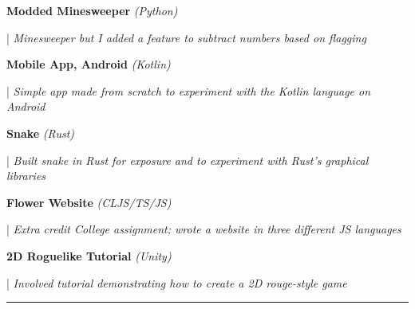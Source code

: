 \documentclass[letterpaper,11pt]{article}
\begin{document}
\begin{minipage}[t]{0.28\textwidth}
	\raggedright
	\textbf{ Modded Minesweeper }\textit{(Python)} \\
\end{minipage}
\hfill
\begin{minipage}[t]{0.70\textwidth}
	\raggedright
	|\textit{ Minesweeper but I added a feature to subtract numbers based on flagging} \\
\end{minipage}

\begin{minipage}[t]{0.28\textwidth}
	\raggedright
	\textbf{ Mobile App, Android }\textit{(Kotlin)} \\
\end{minipage}
\hfill
\begin{minipage}[t]{0.70\textwidth}
	\raggedright
	|\textit{ Simple app made from scratch to experiment with the Kotlin language on Android} \\
\end{minipage}

\begin{minipage}[t]{0.28\textwidth}
	\raggedright
	\textbf{ Snake }\textit{(Rust)}\\
\end{minipage}
\hfill
\begin{minipage}[t]{0.70\textwidth}
	\raggedright
	|\textit{ Built snake in Rust for exposure and to experiment with Rust's graphical libraries} \\
\end{minipage}

\begin{minipage}[t]{0.28\textwidth}
	\raggedright
	\textbf{ Flower Website }\textit{(CLJS/TS/JS)}\\
\end{minipage}
\hfill
\begin{minipage}[t]{0.70\textwidth}
	\raggedright
	|\textit{ Extra credit College assignment; wrote a website in three different JS languages  } \\
\end{minipage}

\begin{minipage}[t]{0.28\textwidth}
	\raggedright
	\textbf{ 2D Roguelike Tutorial }\textit{(Unity)}\\
\end{minipage}
\hfill
\begin{minipage}[t]{0.70\textwidth}
	\raggedright
	|\textit{ Involved tutorial demonstrating how to create a 2D rouge-style game } \\
\end{minipage}
\noindent\rule{19.5cm}{0.4pt}
\end{document}
